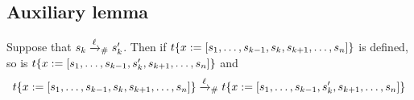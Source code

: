 \subsection*{Auxiliary lemma}

\begin{lemma}[Reduction]
Suppose that $s_k \mathrel{\xrightarrow{\ell}_{\mathtt{\#}}} s'_k$.
Then if
$t\{x := [s_1, \hdots, s_{k-1}, s_k, s_{k+1}, \hdots, s_n]\}$
is defined, so is
$t\{x := [s_1, \hdots, s_{k-1}, s'_k, s_{k+1}, \hdots, s_n]\}$
and
\[
t\{x := [s_1, \hdots, s_{k-1}, s_k, s_{k+1}, \hdots, s_n]\}
\mathrel{\xrightarrow{\ell}_{\mathtt{\#}}}
t\{x := [s_1, \hdots, s_{k-1}, s'_k, s_{k+1}, \hdots, s_n]\}
\]
\end{lemma}
